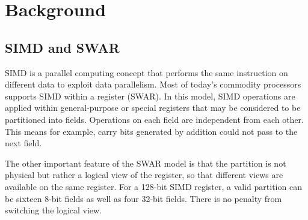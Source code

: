 %
%

\chapter{Background}
\label{two}

\section{SIMD and SWAR}
SIMD is a parallel computing concept that performs the same instruction on different data to exploit data parallelism. Most of today's commodity processors supports SIMD within a register (SWAR). In this model, SIMD operations are applied within general-purpose or special registers that may be considered to be partitioned into fields. Operations on each field are independent from each other. This means for example, carry bits generated by addition could not pass to the next field.

The other important feature of the SWAR model is that the partition is not physical but rather a logical view of the register, so that different views are available on the same register. For a 128-bit SIMD register, a valid partition can be sixteen 8-bit fields as well as four 32-bit fields. There is no penalty from switching the logical view.


